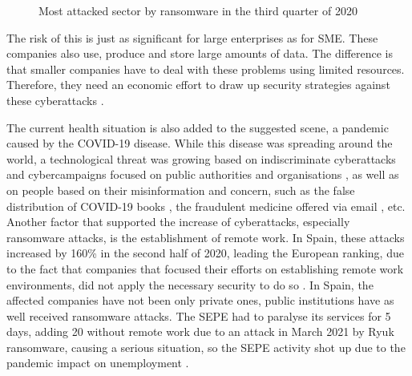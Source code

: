 \begin{figure}[h!]
\begin{center}
{}
\end{center}
\caption{Most attacked sector by ransomware in the third quarter of 2020}
\label{fig:cove}
\end{figure}

The risk of this is just as significant for large enterprises as for \gls{SME}. These companies also use, produce and store large amounts of data. The difference is that smaller companies have to deal with these problems using limited resources. Therefore, they need an economic effort to draw up security strategies against these cyberattacks \cite{KURPJUHN20155}.

The current health situation is also added to the suggested scene, a pandemic caused by the \gls{COVID-19} disease. While this disease was spreading around the world, a technological threat was growing based on indiscriminate cyberattacks and cybercampaigns focused on public authorities and organisations \cite{LALLIE2021102248}, as well as on people based on their misinformation and concern, such as the false distribution of \gls{COVID-19} books \cite{MALWLABS}, the fraudulent medicine offered via email \cite{NORTON}, etc. Another factor that supported the increase of cyberattacks, especially ransomware attacks, is the establishment of remote work. In Spain, these attacks increased by 160\% in the second half of 2020, leading the European ranking, due to the fact that companies that focused their efforts on establishing remote work environments, did not apply the necessary security to do so \cite{ELPAIS}. In Spain, the affected companies have not been only private ones, public institutions have as well received ransomware attacks. The \gls{SEPE} had to paralyse its services for 5 days, adding 20 without remote work due to an attack in March 2021 by Ryuk ransomware, causing a serious situation, so the \gls{SEPE} activity shot up due to the pandemic impact on unemployment \cite{RYUKSEPE}.

